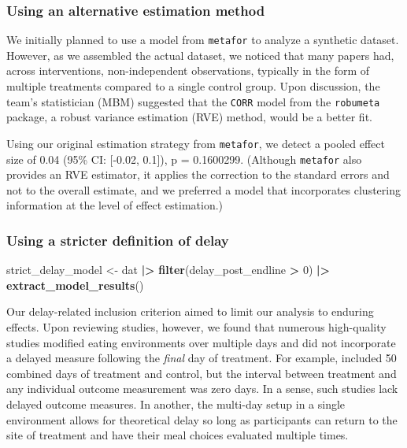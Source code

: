 \documentclass[sn-nature,referee,pdflatex]{sn-jnl}
\newenvironment{Shaded}{\begin{snugshade}}{\end{snugshade}}
\newcommand{\DecValTok}[1]{\textcolor[rgb]{0.00,0.00,0.81}{#1}}
\newcommand{\FunctionTok}[1]{\textcolor[rgb]{0.13,0.29,0.53}{\textbf{#1}}}
\newcommand{\NormalTok}[1]{#1}
\newcommand{\OtherTok}[1]{\textcolor[rgb]{0.56,0.35,0.01}{#1}}
\newcommand{\SpecialCharTok}[1]{\textcolor[rgb]{0.81,0.36,0.00}{\textbf{#1}}}
\begin{document}
\subsubsection{Using an alternative estimation
method}\label{using-an-alternative-estimation-method}

We initially planned to use a model from \texttt{metafor} to analyze a
synthetic dataset. However, as we assembled the actual dataset, we
noticed that many papers had, across interventions, non-independent
observations, typically in the form of multiple treatments compared to a
single control group. Upon discussion, the team's statistician (MBM)
suggested that the \texttt{CORR} model from the \texttt{robumeta}
package, a robust variance estimation (RVE) method, would be a better
fit.

Using our original estimation strategy from \texttt{metafor}, we detect
a pooled effect size of 0.04 (95\% CI: {[}-0.02, 0.1{]}), p = 0.1600299.
(Although \texttt{metafor} also provides an RVE estimator, it applies
the correction to the standard errors and not to the overall estimate,
and we preferred a model that incorporates clustering information at the
level of effect estimation.)

\subsubsection{Using a stricter definition of
delay}\label{using-a-stricter-definition-of-delay}

\begin{Shaded}
\begin{Highlighting}[]
\NormalTok{strict\_delay\_model }\OtherTok{\textless{}{-}}\NormalTok{ dat }\SpecialCharTok{|\textgreater{}} \FunctionTok{filter}\NormalTok{(delay\_post\_endline }\SpecialCharTok{\textgreater{}} \DecValTok{0}\NormalTok{) }\SpecialCharTok{|\textgreater{}} \FunctionTok{extract\_model\_results}\NormalTok{()}
\end{Highlighting}
\end{Shaded}

Our delay-related inclusion criterion aimed to limit our analysis to
enduring effects. Upon reviewing studies, however, we found that
numerous high-quality studies modified eating environments over multiple
days and did not incorporate a delayed measure following the
\emph{final} day of treatment. For example, \citep{andersson2021}
included 50 combined days of treatment and control, but the interval
between treatment and any individual outcome measurement was zero days.
In a sense, such studies lack delayed outcome measures. In another, the
multi-day setup in a single environment allows for theoretical delay so
long as participants can return to the site of treatment and have their
meal choices evaluated multiple times.
\end{document}
